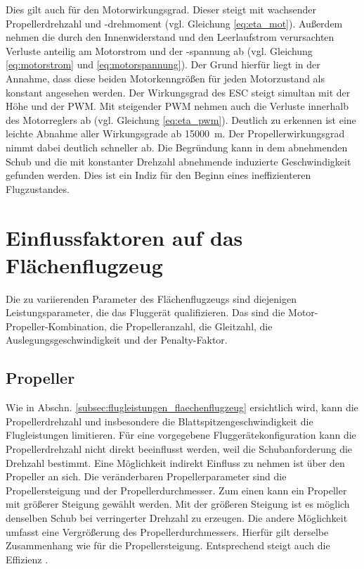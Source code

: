 Dies gilt auch für den Motorwirkungsgrad. Dieser steigt mit wachsender Propellerdrehzahl und -drehmoment (vgl. Gleichung \eqref{eq:eta_mot}). Außerdem nehmen die durch den Innenwiderstand und den Leerlaufstrom verursachten Verluste anteilig am Motorstrom und der -spannung ab (vgl. Gleichung \eqref{eq:motorstrom} und \eqref{eq:motorspannung}). Der Grund hierfür liegt in der Annahme, dass diese beiden Motorkenngrößen für jeden Motorzustand als konstant angesehen werden. Der Wirkungsgrad des ESC steigt simultan mit der Höhe und der PWM. Mit steigender PWM nehmen auch die Verluste innerhalb des Motorreglers ab (vgl. Gleichung \eqref{eq:eta_pwm}). Deutlich zu erkennen ist eine leichte Abnahme aller Wirkungsgrade ab \SI{15000}{m}. Der Propellerwirkungsgrad nimmt dabei deutlich schneller ab. Die Begründung kann in dem abnehmenden Schub und die mit konstanter Drehzahl abnehmende induzierte Geschwindigkeit gefunden werden. Dies ist ein Indiz für den Beginn eines ineffizienteren Flugzustandes.



\section{Einflussfaktoren auf das Flächenflugzeug}
Die zu variierenden Parameter des Flächenflugzeugs sind diejenigen Leistungsparameter, die das Fluggerät qualifizieren. Das sind die Motor-Propeller-Kombination, die Propelleranzahl, die Gleitzahl, die Auslegungsgeschwindigkeit und der Penalty-Faktor.

\subsection{Propeller}
\label{subsec:propeller}
Wie in Abschn. \ref{subsec:flugleistungen_flaechenflugzeug} ersichtlich wird, kann die Propellerdrehzahl und insbesondere die Blattspitzengeschwindigkeit die Flugleistungen limitieren. Für eine vorgegebene Fluggerätekonfiguration kann die Propellerdrehzahl nicht direkt beeinflusst werden, weil die Schubanforderung die Drehzahl bestimmt. Eine Möglichkeit indirekt Einfluss zu nehmen ist über den Propeller an sich. Die veränderbaren Propellerparameter sind die Propellersteigung und der Propellerdurchmesser. 
Zum einen kann ein Propeller mit größerer Steigung gewählt werden. Mit der größeren Steigung ist es möglich denselben Schub bei verringerter Drehzahl zu erzeugen. Die andere Möglichkeit umfasst eine Vergrößerung des Propellerdurchmessers. Hierfür gilt derselbe Zusammenhang wie für die Propellersteigung. Entsprechend steigt auch die Effizienz \cite[119]{Wall.2015}.



